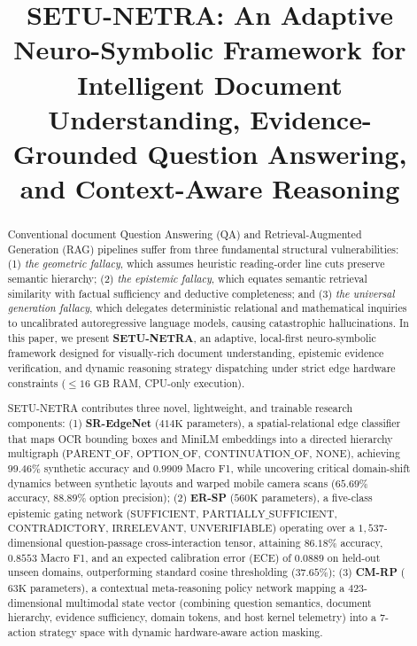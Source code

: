 \documentclass[conference]{IEEEtran}
\begin{document}
\title{SETU-NETRA: An Adaptive Neuro-Symbolic Framework for Intelligent Document Understanding, Evidence-Grounded Question Answering, and Context-Aware Reasoning}

\author{
}

\maketitle

\begin{abstract}
Conventional document Question Answering (QA) and Retrieval-Augmented Generation (RAG) pipelines suffer from three fundamental structural vulnerabilities: (1) \textit{the geometric fallacy}, which assumes heuristic reading-order line cuts preserve semantic hierarchy; (2) \textit{the epistemic fallacy}, which equates semantic retrieval similarity with factual sufficiency and deductive completeness; and (3) \textit{the universal generation fallacy}, which delegates deterministic relational and mathematical inquiries to uncalibrated autoregressive language models, causing catastrophic hallucinations. In this paper, we present \textbf{SETU-NETRA}, an adaptive, local-first neuro-symbolic framework designed for visually-rich document understanding, epistemic evidence verification, and dynamic reasoning strategy dispatching under strict edge hardware constraints ($\le 16\text{ GB}$ RAM, CPU-only execution).

SETU-NETRA contributes three novel, lightweight, and trainable research components:
(1) \textbf{SR-EdgeNet} ($414\text{K}$ parameters), a spatial-relational edge classifier that maps OCR bounding boxes and MiniLM embeddings into a directed hierarchy multigraph ($\text{PARENT\_OF}$, $\text{OPTION\_OF}$, $\text{CONTINUATION\_OF}$, $\text{NONE}$), achieving $99.46\%$ synthetic accuracy and $0.9909$ Macro F1, while uncovering critical domain-shift dynamics between synthetic layouts and warped mobile camera scans ($65.69\%$ accuracy, $88.89\%$ option precision);
(2) \textbf{ER-SP} ($560\text{K}$ parameters), a five-class epistemic gating network ($\text{SUFFICIENT}$, $\text{PARTIALLY\_SUFFICIENT}$, $\text{CONTRADICTORY}$, $\text{IRRELEVANT}$, $\text{UNVERIFIABLE}$) operating over a $1,537$-dimensional question-passage cross-interaction tensor, attaining $86.18\%$ accuracy, $0.8553$ Macro F1, and an expected calibration error (ECE) of $0.0889$ on held-out unseen domains, outperforming standard cosine thresholding ($37.65\%$);
(3) \textbf{CM-RP} ($63\text{K}$ parameters), a contextual meta-reasoning policy network mapping a $423$-dimensional multimodal state vector (combining question semantics, document hierarchy, evidence sufficiency, domain tokens, and host kernel telemetry) into a $7$-action strategy space with dynamic hardware-aware action masking.


\end{abstract}
\end{document}
